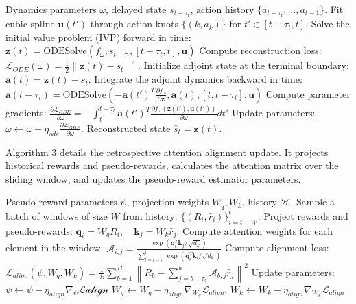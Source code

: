 \documentclass[manuscript, screen, review]{jair}
\begin{document}
\begin{algorithm}[h]
\caption{Predictive Layer Trajectory Integration and Adjoint Sensitivity}
\label{alg:ode_adjoint}
\begin{algorithmic}[1]
\REQUIRE Dynamics parameters $\omega$, delayed state $s_{t-\tau_t}$, action history $\{a_{t-\tau_t}, \dots, a_{t-1}\}$.
\STATE Fit cubic spline $\mathbf{u}(t')$ through action knots $\{(k, a_k)\}$ for $t' \in [t-\tau_t, t]$.
\STATE Solve the initial value problem (IVP) forward in time:
\STATE \quad $\mathbf{z}(t) = \text{ODESolve}(f_\omega, s_{t-\tau_t}, [t-\tau_t, t], \mathbf{u})$
\STATE Compute reconstruction loss: $\mathcal{L}_{ODE}(\omega) = \frac{1}{2} \| \mathbf{z}(t) - s_t \|^2$.
\STATE Initialize adjoint state at the terminal boundary: $\mathbf{a}(t) = \mathbf{z}(t) - s_t$.
\STATE Integrate the adjoint dynamics backward in time:
\STATE \quad $\mathbf{a}(t-\tau_t) = \text{ODESolve}\left(- \mathbf{a}(t')^T \frac{\partial f_\omega}{\partial \mathbf{z}}, \mathbf{a}(t), [t, t-\tau_t], \mathbf{u}\right)$
\STATE Compute parameter gradients:
\STATE \quad $\frac{\partial \mathcal{L}_{ODE}}{\partial \omega} = - \int_{t}^{t-\tau_t} \mathbf{a}(t')^T \frac{\partial f_\omega(\mathbf{z}(t'), \mathbf{u}(t'))}{\partial \omega} dt'$
\STATE Update parameters: $\omega \leftarrow \omega - \eta_{ode} \frac{\partial \mathcal{L}_{ODE}}{\partial \omega}$.
\RETURN Reconstructed state $\hat{s}_t = \mathbf{z}(t)$.
\end{algorithmic}
\end{algorithm}

Algorithm 3 details the retrospective attention alignment update. It projects historical rewards and pseudo-rewards, calculates the attention matrix over the sliding window, and updates the pseudo-reward estimator parameters.

\begin{algorithm}[h]
\caption{Retrospective Layer Attention Alignment Update}
\label{alg:attention_align}
\begin{algorithmic}[1]
\REQUIRE Pseudo-reward parameters $\psi$, projection weights $W_q, W_k$, history $\mathcal{H}$.
\STATE Sample a batch of windows of size $W$ from history: $\{ (R_i, \hat{r}_i) \}_{i=t-W}^t$.
\STATE Project rewards and pseudo-rewards: $\mathbf{q}_i = W_q R_i, \quad \mathbf{k}_j = W_k \hat{r}_j$.
\STATE Compute attention weights for each element in the window:
\STATE \quad $\mathcal{A}_{i, j} = \frac{\exp\left( \mathbf{q}_i^T \mathbf{k}_j / \sqrt{d_k} \right)}{\sum_{l=i-\tau_i}^{i} \exp\left( \mathbf{q}_i^T \mathbf{k}_l / \sqrt{d_k} \right)}$
\STATE Compute alignment loss:
\STATE \quad $\mathcal{L}_{align}(\psi, W_q, W_k) = \frac{1}{B} \sum_{b=1}^B \left\| R_b - \sum_{j=b-\tau_b}^{b} \mathcal{A}_{b, j} \hat{r}_j \right\|^2$
\STATE Update parameters:
\STATE \quad $\psi \leftarrow \psi - \eta_{align} \nabla_\psi \mathcal{L{align}}$
\STATE \quad $W_q \leftarrow W_q - \eta_{align} \nabla_{W_q} \mathcal{L}_{align}$, \quad $W_k \leftarrow W_k - \eta_{align} \nabla_{W_k} \mathcal{L}_{align}$
\end{algorithmic}
\end{algorithm}
\end{document}
